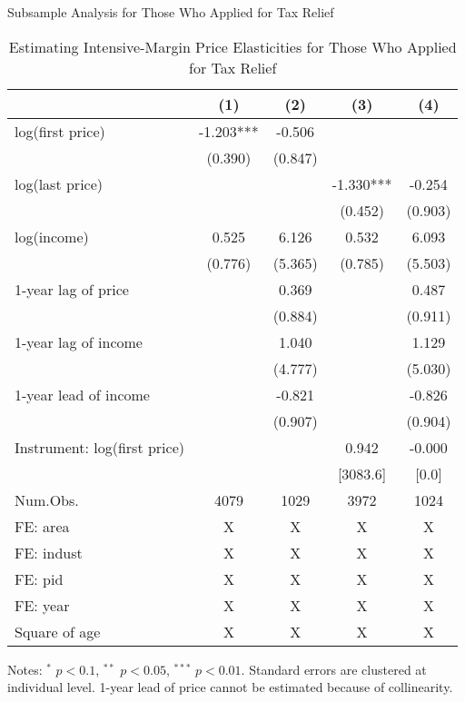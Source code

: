 \documentclass[
  ignorenonframetext,
  aspectratio=169,
]{beamer}
\begin{document}
\begin{frame}{Subsample Analysis for Those Who Applied for Tax Relief}
\protect\hypertarget{subsample-analysis-for-those-who-applied-for-tax-relief}{}
\begin{table}

\caption{\label{tab:R1Elasticity}Estimating Intensive-Margin Price Elasticities for Those Who Applied for Tax Relief}
\centering
\fontsize{5}{7}\selectfont
\begin{threeparttable}
\begin{tabular}[t]{lcccc}
\toprule
  & (1) & (2) & (3) & (4)\\
\midrule
log(first price) & -1.203*** & -0.506 &  & \\
 & (0.390) & (0.847) &  & \\
log(last price) &  &  & -1.330*** & -0.254\\
 &  &  & (0.452) & (0.903)\\
log(income) & 0.525 & 6.126 & 0.532 & 6.093\\
 & (0.776) & (5.365) & (0.785) & (5.503)\\
1-year lag of price &  & 0.369 &  & 0.487\\
 &  & (0.884) &  & (0.911)\\
1-year lag of income &  & 1.040 &  & 1.129\\
 &  & (4.777) &  & (5.030)\\
1-year lead of income &  & -0.821 &  & -0.826\\
 &  & (0.907) &  & (0.904)\\
\midrule
Instrument: log(first price) &  &  & 0.942 & -0.000\\
 &  &  & [3083.6] & [0.0]\\
Num.Obs. & 4079 & 1029 & 3972 & 1024\\
FE: area & X & X & X & X\\
FE: indust & X & X & X & X\\
FE: pid & X & X & X & X\\
FE: year & X & X & X & X\\
Square of age & X & X & X & X\\
\bottomrule
\end{tabular}
\begin{tablenotes}
\item Notes: $^{*}$ $p < 0.1$, $^{**}$ $p < 0.05$, $^{***}$ $p < 0.01$. Standard errors are clustered at individual level. 1-year lead of price cannot be estimated because of collinearity.
\end{tablenotes}
\end{threeparttable}
\end{table}
\end{frame}
\end{document}
